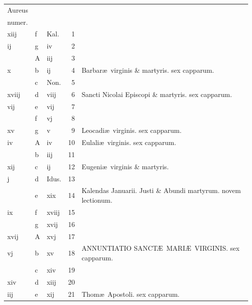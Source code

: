 \documentclass[letter,11pt]{book}
\begin{document}
\begin{center}
\begin{tabular}{l | l | l | r | l}
\color{Red}Aureus & & & \\
\color{Red}numer. & & & \\
\color{Red} xiij & f & \color{Red} Kal. & 1 & \\
\color{Red} ij & g & \color{Red} iv & 2 & \\
\color{Red}  & \color{Red} A & \color{Red} iij & 3 & \\
\color{Red} x & b & \color{Red} ij & 4 & Barbar\ae \ virginis \& martyris. \color{Red} sex capparum. \\
\color{Red}  & c & Non. & 5 & \\
\color{Red} xviij & d & \color{Red} viij & 6 & Sancti Nicolai Episcopi \& martyris. \color{Red} sex capparum. \\
\color{Red} vij & e & \color{Red} vij & 7 & \\
\color{Red}  & f & \color{Red} vj & 8 & \\
\color{Red} xv & g & \color{Red} v & 9 & \color{Red} Leocadi\ae \ virginis. \color{black} sex capparum. \\
\color{Red} iv & \color{Red} A & \color{Red} iv & 10 & \color{Red} Eulali\ae \ virginis. \color{black} sex capparum. \\
\color{Red}  & b & \color{Red} iij & 11 & \\
\color{Red} xij & c & \color{Red} ij & 12 & Eugeni\ae \ virginis \& martyris. \\
\color{Red} j & d & Idus. & 13 & \\
\color{Red}  & e & \color{Red} xix & 14 & \qquad \color{Red} Kalendas Januarii. \color{black} Justi \& Abundi martyrum. \color{Red} novem lectionum. \\
\color{Red} ix & f & \color{Red} xviij & 15 & \\
\color{Red}  & g & \color{Red} xvij & 16 & \\
\color{Red} xvij & \color{Red} A & \color{Red} xvj & 17 & \\
\color{Red} vj & b & \color{Red} xv & 18 & ANNUNTIATIO SANCT\AE \ MARI\AE \ VIRGINIS. \color{Red} sex capparum. \\
\color{Red}  & c & \color{Red} xiv & 19 & \\
\color{Red} xiv & d & \color{Red} xiij & 20 & \\
\color{Red} iij & e & \color{Red} xij & 21 & \color{Red} Thom\ae \ Apostoli. \color{black} sex capparum. \\

\end{tabular}
\end{center}
\end{document}
